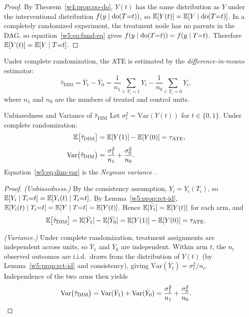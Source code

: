 \documentclass[master.tex]{subfiles}
\begin{document}
\begin{proof}
By Theorem~\ref{w4:prop:po-do}, $Y(t)$ has the same distribution as
$Y$ under the interventional distribution $f(y \mid \mathrm{do}(T{=}t))$, so
$\mathbb{E}[Y(t)] = \mathbb{E}[Y \mid \mathrm{do}(T{=}t)]$.  In a completely randomized
experiment, the treatment node has no parents in the DAG, so
equation~\eqref{w5:eq:fund-eq} gives
$f(y \mid \mathrm{do}(T{=}t)) = f(y \mid T{=}t)$.
Therefore $\mathbb{E}[Y(t)] = \mathbb{E}[Y \mid T{=}t]$.
\end{proof}

\noindent Under complete randomization, the ATE is estimated by the
\emph{difference-in-means} estimator:
\[
  \hat\tau_{\mathrm{DIM}}
  = \bar Y_1 - \bar Y_0
  = \frac{1}{n_1}\sum_{i:\, T_i=1} Y_i
  - \frac{1}{n_0}\sum_{i:\, T_i=0} Y_i,
\]
where $n_1$ and $n_0$ are the numbers of treated and control units.

\begin{thm}{Unbiasedness and Variance of $\hat\tau_{\mathrm{DIM}}$}
\label{w5:prop:dim}
Let $\sigma_t^2 = \mathrm{Var}(Y(t))$ for $t \in \{0,1\}$.
Under complete randomization:
\begin{align}
  \mathbb{E}\bigl[\hat\tau_{\mathrm{DIM}}\bigr]
  &= \mathbb{E}[Y(1)] - \mathbb{E}[Y(0)] = \tau_{\mathrm{ATE}},
  \label{w5:eq:dim-mean} \\[4pt]
  \mathrm{Var}\bigl(\hat\tau_{\mathrm{DIM}}\bigr)
  &= \frac{\sigma_1^2}{n_1} + \frac{\sigma_0^2}{n_0}.
  \label{w5:eq:dim-var}
\end{align}
Equation~\eqref{w5:eq:dim-var} is the \emph{Neyman variance}
\citep{neyman1923application}.
\end{thm}

\begin{proof}
\textit{(Unbiasedness.)}
By the consistency assumption, $Y_i = Y_i(T_i)$, so
$\mathbb{E}[Y_i \mid T_i{=}t] = \mathbb{E}[Y_i(t) \mid T_i{=}t]$.
By Lemma~\ref{w5:prop:rct-id},
$\mathbb{E}[Y_i(t) \mid T_i{=}t] = \mathbb{E}[Y \mid T{=}t] = \mathbb{E}[Y(t)]$.
Hence $\mathbb{E}[\bar Y_t] = \mathbb{E}[Y(t)]$ for each arm, and
\[
  \mathbb{E}\bigl[\hat\tau_{\mathrm{DIM}}\bigr]
  = \mathbb{E}[\bar Y_1] - \mathbb{E}[\bar Y_0]
  = \mathbb{E}[Y(1)] - \mathbb{E}[Y(0)] = \tau_{\mathrm{ATE}}.
\]

\smallskip\noindent\textit{(Variance.)}
Under complete randomization, treatment assignments are independent
across units, so $\bar Y_1$ and $\bar Y_0$ are independent.
Within arm $t$, the $n_t$ observed outcomes are i.i.d.\ draws from the
distribution of $Y(t)$ (by Lemma~\ref{w5:prop:rct-id} and
consistency), giving $\mathrm{Var}(\bar Y_t) = \sigma_t^2 / n_t$.
Independence of the two arms then yields
\[
  \mathrm{Var}\bigl(\hat\tau_{\mathrm{DIM}}\bigr)
  = \mathrm{Var}(\bar Y_1) + \mathrm{Var}(\bar Y_0)
  = \frac{\sigma_1^2}{n_1} + \frac{\sigma_0^2}{n_0}. \qedhere
\]
\end{proof}
\end{document}
